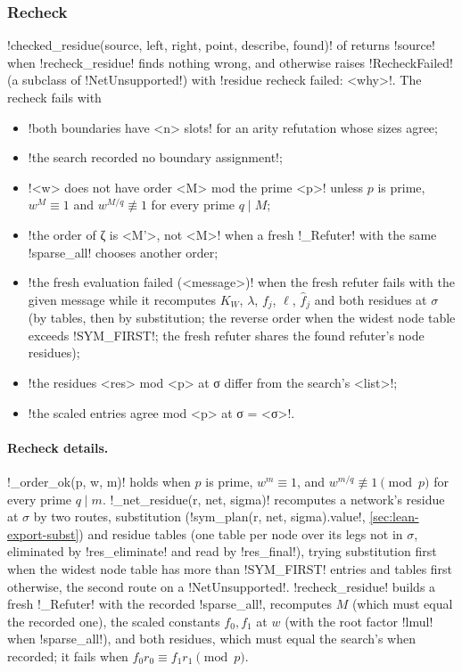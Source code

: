 {{{\subsubsection{Recheck}\label{sec:lean-export-refute-recheck}

\lexpy!checked_residue(source, left, right, point, describe, found)! of
 returns \lexcode!source! when
\lexpy!recheck_residue! finds nothing wrong, and otherwise raises \lexpy!RecheckFailed! (a subclass of
\lexpy!NetUnsupported!) with \lexcode!residue recheck failed: <why>!. The recheck fails with
\begin{itemize}
\item \lexcode!both boundaries have <n> slots! for an arity refutation whose sizes agree;
\item \lexcode!the search recorded no boundary assignment!;
\item \lexcode!<w> does not have order <M> mod the prime <p>! unless $p$ is prime, $w^M \equiv 1$ and
$w^{M/q} \not\equiv 1$ for every prime $q \mid M$;
\item \lexcode!the order of ζ is <M'>, not <M>! when a fresh \lexpy!_Refuter! with the same
\lexpy!sparse_all! chooses another order;
\item \lexcode!the fresh evaluation failed (<message>)! when the fresh refuter fails with
the given message while it recomputes $K_W$, $\lambda$, $f_j$, $\ell$, $\hat f_j$ and both
residues at $\sigma$ (by tables, then by substitution; the reverse order when the widest node
table exceeds \lexpy!SYM_FIRST!; the fresh refuter shares the found refuter's node residues);
\item \lexcode!the residues <res> mod <p> at σ differ from the search's <list>!;
\item \lexcode!the scaled entries agree mod <p> at σ = <σ>!.
\end{itemize}

\paragraph{Recheck details.} \lexpy!_order_ok(p, w, m)! holds when $p$ is prime, $w^m\equiv1$, and $w^{m/q}\not\equiv1 \pmod p$ for every prime $q\mid m$. \lexpy!_net_residue(r, net, sigma)! recomputes a network's residue at $\sigma$ by two routes, substitution (\lexpy!sym_plan(r, net, sigma).value!, \cref{sec:lean-export-subst}) and residue tables (one table per node over its legs not in $\sigma$, eliminated by \lexpy!res_eliminate! and read by \lexpy!res_final!), trying substitution first when the widest node table has more than \lexpy!SYM_FIRST! entries and tables first otherwise, the second route on a \lexpy!NetUnsupported!. \lexpy!recheck_residue! builds a fresh \lexpy!_Refuter! with the recorded \lexpy!sparse_all!, recomputes $M$ (which must equal the recorded one), the scaled constants $f_0,f_1$ at $w$ (with the root factor \lexpy!lmul! when \lexpy!sparse_all!), and both residues, which must equal the search's when recorded; it fails when $f_0r_0\equiv f_1r_1\pmod p$.

}}}
